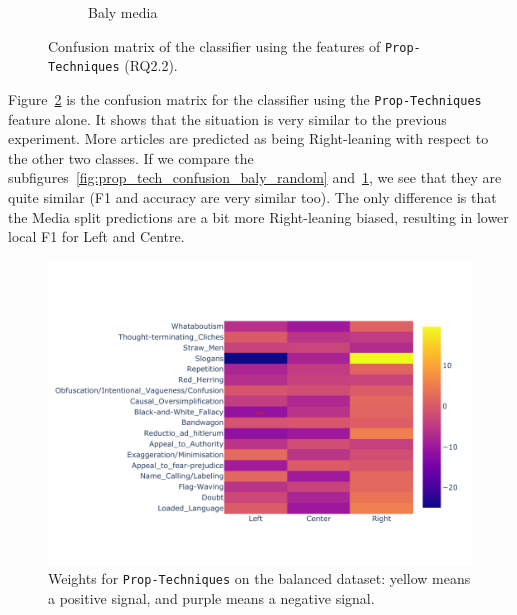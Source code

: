 \begin{figure}[!htb]
\begin{subfigure}[b]{0.48\linewidth}
         \caption{Baly media}
         \label{fig:prop_tech_confusion_baly_media}
     \end{subfigure}
    \caption{Confusion matrix of the classifier using the features of \texttt{Prop-Techniques} (RQ2.2).}
    \label{fig:prop_tech_confusion}
\end{figure}


Figure~\ref{fig:prop_tech_confusion} is the confusion matrix for the classifier using the \texttt{Prop-Techniques} feature alone. It shows that the situation is very similar to the previous experiment. More articles are predicted as being Right-leaning with respect to the other two classes. %
If we compare the subfigures~\ref{fig:prop_tech_confusion_baly_random} and~\ref{fig:prop_tech_confusion_baly_media}, we see that they are quite similar (F1 and accuracy are very similar too). The only difference is that the Media split predictions are a bit more Right-leaning biased, resulting in lower local F1 for Left and Centre.

\begin{figure}[!htb]
    \centering
    \includegraphics[width=\linewidth]{figures/nodes_stratifiedbalanced_weights_propaganda_percentages-small.pdf}
    \caption{Weights for \texttt{Prop-Techniques} on the balanced dataset: yellow means a positive signal, and purple means a negative signal.}
    \label{fig:prop_tech_weights}
\end{figure}

